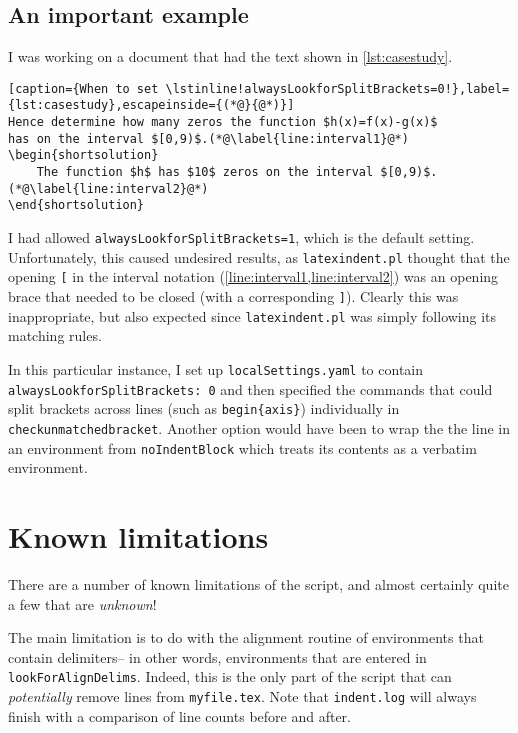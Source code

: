 \subsection{An important example}
I was working on a document that had the text shown in \cref{lst:casestudy}. 
\begin{lstlisting}[caption={When to set \lstinline!alwaysLookforSplitBrackets=0!},label={lst:casestudy},escapeinside={(*@}{@*)}]
Hence determine how many zeros the function $h(x)=f(x)-g(x)$
has on the interval $[0,9)$.(*@\label{line:interval1}@*)
\begin{shortsolution}
	The function $h$ has $10$ zeros on the interval $[0,9)$.(*@\label{line:interval2}@*)
\end{shortsolution}
\end{lstlisting}
I had allowed \lstinline!alwaysLookforSplitBrackets=1!, which is the default setting. 
Unfortunately, this caused undesired results, as \lstinline!latexindent.pl! thought that the opening 
\lstinline![!  in the interval notation (\cref{line:interval1,line:interval2}) 
was an opening brace that needed to be closed (with a corresponding \lstinline!]!). Clearly 
this was inappropriate, but also expected since \lstinline!latexindent.pl! was simply
following its matching rules.

In this particular instance, I set up \lstinline!localSettings.yaml! 
to contain \lstinline!alwaysLookforSplitBrackets: 0! and then specified the commands 
that could split brackets across lines (such as \lstinline!begin{axis}!) individually
in \lstinline!checkunmatchedbracket!.  Another option would have been to wrap the 
the line in an environment from \lstinline!noIndentBlock! which treats its contents
as a verbatim environment.

 	 	 	 	 	
\section{Known limitations}\label{sec:knownlimitations}
There are a number of known limitations of the script, and almost certainly quite a
few that are \emph{unknown}!
      
The main limitation is to do with the alignment routine of environments that contain 
delimiters-- in other words, environments that are entered in \lstinline!lookForAlignDelims!.
Indeed, this is the only part of the script that can \emph{potentially} remove 
lines from \lstinline!myfile.tex!. Note that \lstinline!indent.log! will always
finish with a comparison of line counts before and after. 
      
